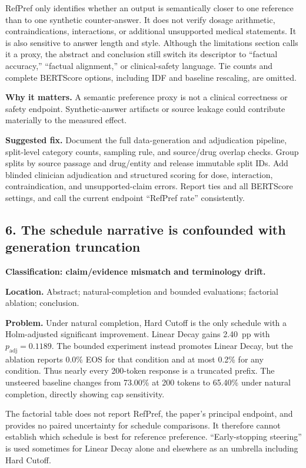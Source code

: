 \documentclass[11pt]{article}
\begin{document}
RefPref only identifies whether an output is semantically closer to one reference than to one synthetic counter-answer.  It does not verify dosage arithmetic, contraindications, interactions, or additional unsupported medical statements.  It is also sensitive to answer length and style.  Although the limitations section calls it a proxy, the abstract and conclusion still switch its descriptor to ``factual accuracy,'' ``factual alignment,'' or clinical-safety language.  Tie counts and complete BERTScore options, including IDF and baseline rescaling, are omitted.

\textbf{Why it matters.} A semantic preference proxy is not a clinical correctness or safety endpoint.  Synthetic-answer artifacts or source leakage could contribute materially to the measured effect.

\textbf{Suggested fix.} Document the full data-generation and adjudication pipeline, split-level category counts, sampling rule, and source/drug overlap checks.  Group splits by source passage and drug/entity and release immutable split IDs.  Add blinded clinician adjudication and structured scoring for dose, interaction, contraindication, and unsupported-claim errors.  Report ties and all BERTScore settings, and call the current endpoint ``RefPref rate'' consistently.

\subsection*{6. The schedule narrative is confounded with generation truncation}

\textbf{Classification: claim/evidence mismatch and terminology drift.}

\textbf{Location.} Abstract; natural-completion and bounded evaluations; factorial ablation; conclusion.

\textbf{Problem.} Under natural completion, Hard Cutoff is the only schedule with a Holm-adjusted significant improvement.  Linear Decay gains 2.40~pp with $p_{\text{adj}}=0.1189$.  The bounded experiment instead promotes Linear Decay, but the ablation reports 0.0\% EOS for that condition and at most 0.2\% for any condition.  Thus nearly every 200-token response is a truncated prefix.  The unsteered baseline changes from 73.00\% at 200 tokens to 65.40\% under natural completion, directly showing cap sensitivity.

The factorial table does not report RefPref, the paper's principal endpoint, and provides no paired uncertainty for schedule comparisons.  It therefore cannot establish which schedule is best for reference preference.  ``Early-stopping steering'' is used sometimes for Linear Decay alone and elsewhere as an umbrella including Hard Cutoff.
\end{document}
